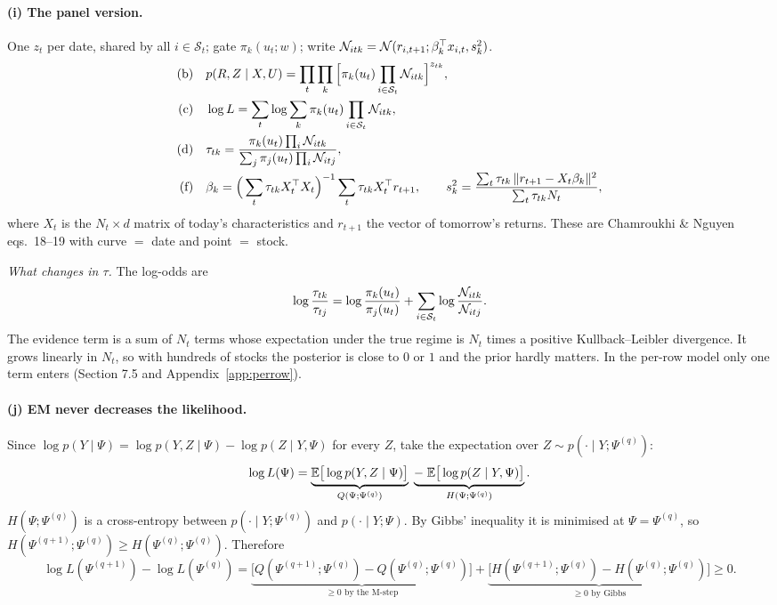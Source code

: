 \paragraph{(i) The panel version.} One $z_t$ per date, shared by all $i\in\mathcal S_t$; gate $\pi_k(u_t;w)$; write $\mathcal{N}_{itk}=\mathcal{N}(r_{i,t+1};\beta_k^{\top} x_{i,t},s_k^2)$.
\begin{align}
\text{(b)}\quad&p(R,Z\mid X,U)=\prod_t\prod_k\Big[\pi_k(u_t)\prod_{i\in\mathcal S_t}\mathcal{N}_{itk}\Big]^{z_{tk}},\\
\text{(c)}\quad&\log L=\sum_t\log\sum_k\pi_k(u_t)\prod_{i\in\mathcal S_t}\mathcal{N}_{itk},\\
\text{(d)}\quad&\tau_{tk}=\frac{\pi_k(u_t)\prod_i\mathcal{N}_{itk}}{\sum_j\pi_j(u_t)\prod_i\mathcal{N}_{itj}},\\
\text{(f)}\quad&\beta_k=\Big(\sum_t\tau_{tk}X_t^{\top} X_t\Big)^{-1}\sum_t\tau_{tk}X_t^{\top} r_{t+1},\qquad s_k^2=\frac{\sum_t\tau_{tk}\,\|r_{t+1}-X_t\beta_k\|^2}{\sum_t\tau_{tk}N_t},
\end{align}
where $X_t$ is the $N_t\times d$ matrix of today's characteristics and $r_{t+1}$ the vector of tomorrow's returns. These are Chamroukhi \& Nguyen eqs.~18--19 with curve $=$ date and point $=$ stock.

\emph{What changes in $\tau$.} The log-odds are
\begin{equation}
\log\frac{\tau_{tk}}{\tau_{tj}}=\log\frac{\pi_k(u_t)}{\pi_j(u_t)}+\sum_{i\in\mathcal S_t}\log\frac{\mathcal{N}_{itk}}{\mathcal{N}_{itj}}.
\end{equation}
The evidence term is a sum of $N_t$ terms whose expectation under the true regime is $N_t$ times a positive Kullback--Leibler divergence. It grows linearly in $N_t$, so with hundreds of stocks the posterior is close to $0$ or $1$ and the prior hardly matters. In the per-row model only one term enters (Section 7.5 and Appendix~\ref{app:perrow}).

\paragraph{(j) EM never decreases the likelihood.} Since $\log p(Y\mid\Psi)=\log p(Y,Z\mid\Psi)-\log p(Z\mid Y,\Psi)$ for every $Z$, take the expectation over $Z\sim p(\cdot\mid Y;\Psi^{(q)})$:
\begin{equation}
\log L(\Psi)=\underbrace{\mathbb{E}\big[\log p(Y,Z\mid\Psi)\big]}_{Q(\Psi;\Psi^{(q)})}\;\underbrace{-\;\mathbb{E}\big[\log p(Z\mid Y,\Psi)\big]}_{H(\Psi;\Psi^{(q)})}.
\end{equation}
$H(\Psi;\Psi^{(q)})$ is a cross-entropy between $p(\cdot\mid Y;\Psi^{(q)})$ and $p(\cdot\mid Y;\Psi)$. By Gibbs' inequality it is minimised at $\Psi=\Psi^{(q)}$, so $H(\Psi^{(q+1)};\Psi^{(q)})\ge H(\Psi^{(q)};\Psi^{(q)})$. Therefore
\begin{equation}
\log L(\Psi^{(q+1)})-\log L(\Psi^{(q)})=\underbrace{\big[Q(\Psi^{(q+1)};\Psi^{(q)})-Q(\Psi^{(q)};\Psi^{(q)})\big]}_{\ge0\text{ by the M-step}}+\underbrace{\big[H(\Psi^{(q+1)};\Psi^{(q)})-H(\Psi^{(q)};\Psi^{(q)})\big]}_{\ge0\text{ by Gibbs}}\ge0.
\end{equation}
\newpage
